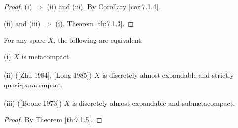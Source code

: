 \documentclass[main.tex]{subfiles}
\begin{document}
\begin{proof}
(i) $\Rightarrow$ (ii) and (iii).  By Corollary \ref{cor:7.1.4}.

(ii) and (iii) $\Rightarrow$ (i).  Theorem \ref{th:7.1.3}.
\end{proof}

{\corollary{} \label{cor:7.1.6}
For any space $X$,  the following are equivalent:

\textup{(i)} $X$ is metacompact.

\textup{(ii) ([Zhu 1984]\textsuperscript{\cite{Zhu1988}}, [Long 1985]\textsuperscript{\cite{Long}})}
$X$ is discretely almost expandable and strictly quasi-paracompact.


\textup{(iii) ([Boone 1973]\textsuperscript{\cite{Boone}})} $X$ is discretely almost expandable and submetacompact.
}

\begin{proof}
By Theorem \ref{th:7.1.5}.
\end{proof}



\end{document}
